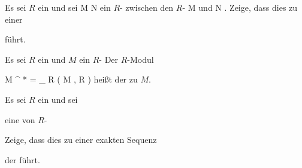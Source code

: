 {}
{





Es sei $R$ ein
und sei
\maabb {\varphi} { M } { N
} {}
ein
$R$-
zwischen den
$R$-
\mathkor {} {M} {und} {N} {.}
Zeige, dass dies zu einer

 {  }

führt.





}
{} {}







Es sei $R$ ein
 und $M$ ein
$R$- Der $R$-Modul

\mavergleichskettedisp
{\vergleichskette
{ {  M   }^{ * }
}
{ =} { _{  R } \left(   M  ,  R   \right)
}
{ } {
}
{ } {
}
{ } {
}
}
{}{}{}
heißt der
zu $M$.







{}
{





Es sei $R$ ein
 und sei

 {  }

eine
von
$R$-

 Zeige, dass dies zu einer exakten Sequenz

 {  }

der
führt.





}
{} {}

